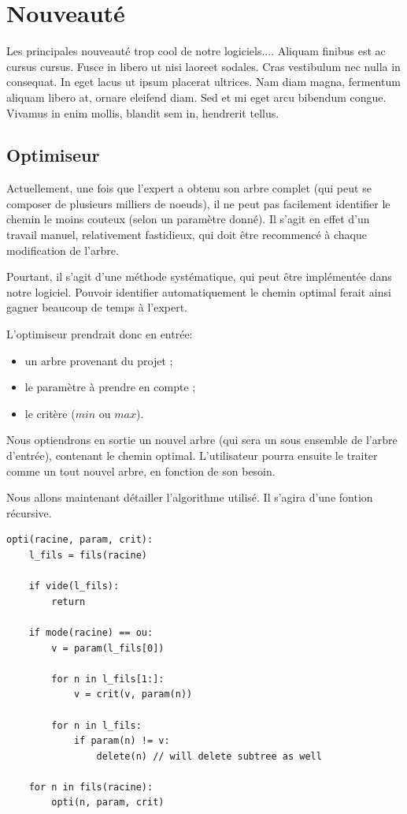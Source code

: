\section{Nouveauté}
	
	Les principales nouveauté trop cool de notre logiciels....	Aliquam finibus est ac cursus cursus. Fusce in libero ut nisi laoreet sodales. Cras vestibulum nec nulla in consequat. In eget lacus ut ipsum placerat ultrices. Nam diam magna, fermentum aliquam libero at, ornare eleifend diam. Sed et mi eget arcu bibendum congue. Vivamus in enim mollis, blandit sem in, hendrerit tellus.


	\subsection{Optimiseur}
		
		Actuellement, une fois que l'expert a obtenu son arbre complet (qui peut se composer de plusieurs milliers de noeuds), il ne peut pas facilement identifier le chemin le moins couteux (selon un paramètre donné).
		Il s'agit en effet d'un travail manuel, relativement fastidieux, qui doit être recommencé à chaque modification de l'arbre.
		
		Pourtant, il s'agit d'une méthode systématique, qui peut être implémentée dans notre logiciel.
		Pouvoir identifier automatiquement le chemin optimal ferait ainsi gagner beaucoup de temps à l'expert.
		
		L'optimiseur prendrait donc en entrée:
		\begin{itemize}
			\item un arbre provenant du projet ;
			\item le paramètre à prendre en compte ;
			\item le critère ($min$ ou $max$).
		\end{itemize}
		
		Nous optiendrons en sortie un nouvel arbre (qui sera un sous ensemble de l'arbre d'entrée), contenant le chemin optimal. 
		L'utilisateur pourra ensuite le traiter comme un tout nouvel arbre, en fonction de son besoin.
		
		Nous allons maintenant détailler l'algorithme utilisé. Il s'agira d'une fontion récursive.

		\begin{lstlisting}
opti(racine, param, crit):
	l_fils = fils(racine)

	if vide(l_fils):
		return

	if mode(racine) == ou:
		v = param(l_fils[0])

		for n in l_fils[1:]:
			v = crit(v, param(n))

		for n in l_fils:
			if param(n) != v:
				delete(n) // will delete subtree as well
	
	for n in fils(racine):
		opti(n, param, crit)
		\end{lstlisting}

